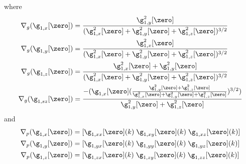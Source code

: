 where
\begin{equation}
  \begin{aligned}\label{eq:spherical-chain-rule}
    \nabla_g (\g_{1,x}[\zero]) &= \frac{\g_{1,y}^2[\zero]}{(\g_{1,x}^2[\zero] + \g_{1,y}^2[\zero] + \g_{1,z}^2[\zero])^{3/2}} \\
    \nabla_g (\g_{1,y}[\zero]) &= \frac{\g_{1,x}^2[\zero]}{(\g_{1,x}^2[\zero] + \g_{1,y}^2[\zero] + \g_{1,z}^2[\zero])^{3/2}} \\
    \nabla_g (\g_{1,z}[\zero]) &= \frac{\g_{1,x}^2[\zero] + \g_{1,y}^2[\zero]}{(\g_{1,x}^2[\zero] + \g_{1,y}^2[\zero] + \g_{1,z}^2[\zero])^{3/2}} \\
    \nabla_g (\g_{1,sz}[\zero]) &= \frac{-(\g_{1,x}[\zero] ( \frac{\g_{1,y}^2[\zero] + \g_{1,z}^2[\zero]}{\g_{1,x}^2[\zero] + \g_{1,y}^2[\zero] + \g_{1,z}^2[\zero]})^{3/2})}{\g_{1,y}^2[\zero] + \g_{1,z}^2[\zero]}
  \end{aligned}
\end{equation}
and
\begin{equation}
  \begin{aligned}\label{eq:spherical-second-order-derivs}
    \nabla_p (\g_{1,x}[\zero]) &= [ \g_{1,xx}[\zero](k) \; \g_{1,xy}[\zero](k) \; \g_{1,xz}[\zero](k) ] \\
    \nabla_p (\g_{1,y}[\zero]) &= [ \g_{1,yx}[\zero](k) \; \g_{1,yy}[\zero](k) \; \g_{1,yz}[\zero](k) ] \\
    \nabla_p (\g_{1,z}[\zero]) &= [ \g_{1,zx}[\zero](k) \; \g_{1,zy}[\zero](k) \; \g_{1,zz}[\zero](k) ] \\
  \end{aligned}
\end{equation}

